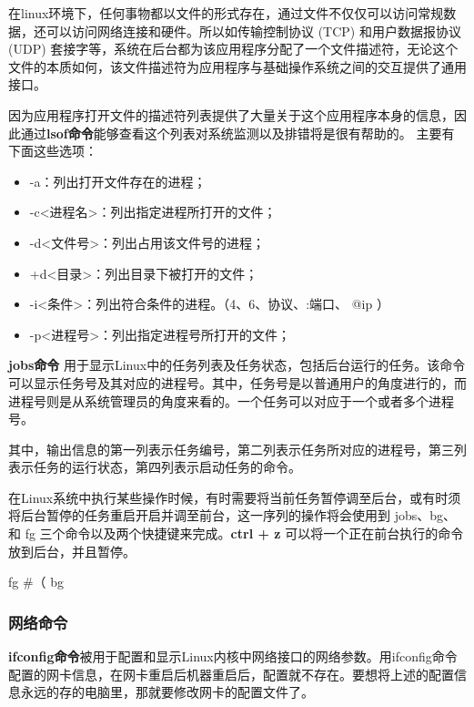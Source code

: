 在linux环境下，任何事物都以文件的形式存在，通过文件不仅仅可以访问常规数据，还可以访问网络连接和硬件。所以如传输控制协议 (TCP) 和用户数据报协议 (UDP) 套接字等，系统在后台都为该应用程序分配了一个文件描述符，无论这个文件的本质如何，该文件描述符为应用程序与基础操作系统之间的交互提供了通用接口。

因为应用程序打开文件的描述符列表提供了大量关于这个应用程序本身的信息，因此通过\textbf{lsof命令}能够查看这个列表对系统监测以及排错将是很有帮助的。 主要有下面这些选项：
\begin{itemize}
\item -a：列出打开文件存在的进程； 
\item -c<进程名>：列出指定进程所打开的文件； 
\item -d<文件号>：列出占用该文件号的进程； 
\item +d<目录>：列出目录下被打开的文件； 
\item -i<条件>：列出符合条件的进程。（4、6、协议、:端口、 @ip ） 
\item -p<进程号>：列出指定进程号所打开的文件；
\end{itemize}
\textbf{jobs命令} 用于显示Linux中的任务列表及任务状态，包括后台运行的任务。该命令可以显示任务号及其对应的进程号。其中，任务号是以普通用户的角度进行的，而进程号则是从系统管理员的角度来看的。一个任务可以对应于一个或者多个进程号。 

其中，输出信息的第一列表示任务编号，第二列表示任务所对应的进程号，第三列表示任务的运行状态，第四列表示启动任务的命令。 

在Linux系统中执行某些操作时候，有时需要将当前任务暂停调至后台，或有时须将后台暂停的任务重启开启并调至前台，这一序列的操作将会使用到 jobs、bg、和 fg 三个命令以及两个快捷键来完成。\textbf{ctrl + z} 可以将一个正在前台执行的命令放到后台，并且暂停。

\begin{Code}
fg %
               #（%
bg %
\end{Code}

\subsubsection{网络命令} 

\textbf{ifconfig命令}被用于配置和显示Linux内核中网络接口的网络参数。用ifconfig命令配置的网卡信息，在网卡重启后机器重启后，配置就不存在。要想将上述的配置信息永远的存的电脑里，那就要修改网卡的配置文件了。

